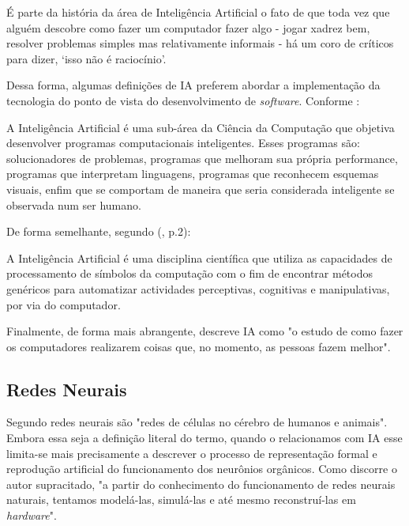 \begin{citacao}
É parte da história da área de Inteligência Artificial o fato de que toda vez que alguém descobre como fazer um computador fazer algo - jogar xadrez bem, resolver problemas simples mas relativamente informais - há um coro de críticos para dizer, ‘isso não é raciocínio’.
\end{citacao}

Dessa forma, algumas definições de IA preferem abordar a implementação da tecnologia do ponto de vista do desenvolvimento de \textit{software}. Conforme :

\begin{citacao}
A Inteligência Artificial é uma sub-área da Ciência da Computação que objetiva desenvolver programas computacionais inteligentes. Esses programas são: solucionadores de problemas, programas que melhoram sua própria performance, programas que interpretam linguagens, programas que reconhecem esquemas visuais, enfim que se comportam de maneira que seria considerada inteligente se observada num ser humano.
\end{citacao}

De forma semelhante, segundo \citeauthor{pereira88} (\citeyear{pereira88}, p.2):

\begin{citacao}
A Inteligência Artificial é uma disciplina científica que utiliza as capacidades de processamento de símbolos da computação com o fim de encontrar métodos genéricos para automatizar actividades perceptivas, cognitivas e manipulativas, por via do computador.
\end{citacao}

Finalmente, de forma mais abrangente,  descreve IA como "o estudo de como fazer os computadores realizarem coisas que, no momento, as pessoas fazem melhor".

\subsection {Redes Neurais}
Segundo  redes neurais são "redes de células no cérebro de humanos e animais". Embora essa seja a definição literal do termo, quando o relacionamos com IA esse limita-se mais precisamente a descrever o processo de representação formal e reprodução artificial do funcionamento dos neurônios orgânicos. Como discorre o autor supracitado, "a partir do conhecimento do funcionamento de redes neurais naturais, tentamos modelá-las, simulá-las e até mesmo reconstruí-las em \textit{hardware}".

